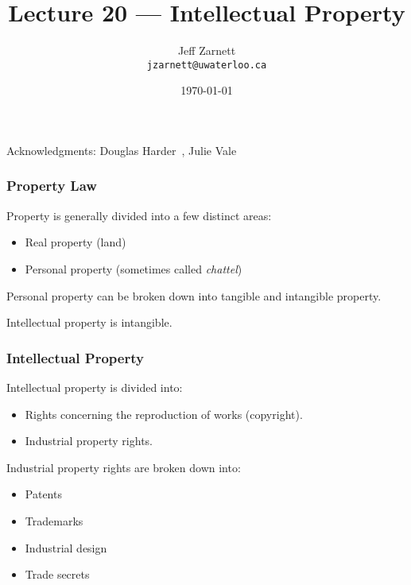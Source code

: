 

\title{Lecture 20 --- Intellectual Property }

\author{Jeff Zarnett \\ \small \texttt{jzarnett@uwaterloo.ca}}
\date{\today}




\begin{frame}
  \titlepage

\begin{center}
  \small{Acknowledgments: Douglas Harder~\cite{dwh}, Julie Vale~\cite{jv}}
  \end{center}
\end{frame}



\begin{frame}
\frametitle{Property Law}

Property is generally divided into a few distinct areas:

\begin{itemize}
	\item Real property (land)
	\item Personal property (sometimes called \textit{chattel})
\end{itemize}

Personal property can be broken down into tangible and intangible property.

Intellectual property is intangible. 

\end{frame}



\begin{frame}
\frametitle{Intellectual Property}

Intellectual property is divided into:
\begin{itemize}
	\item Rights concerning the reproduction of works (copyright).
	\item Industrial property rights.
\end{itemize}

Industrial property rights are broken down into:

\begin{itemize}
	\item Patents
	\item Trademarks
	\item Industrial design
	\item Trade secrets
\end{itemize}


\end{frame}



